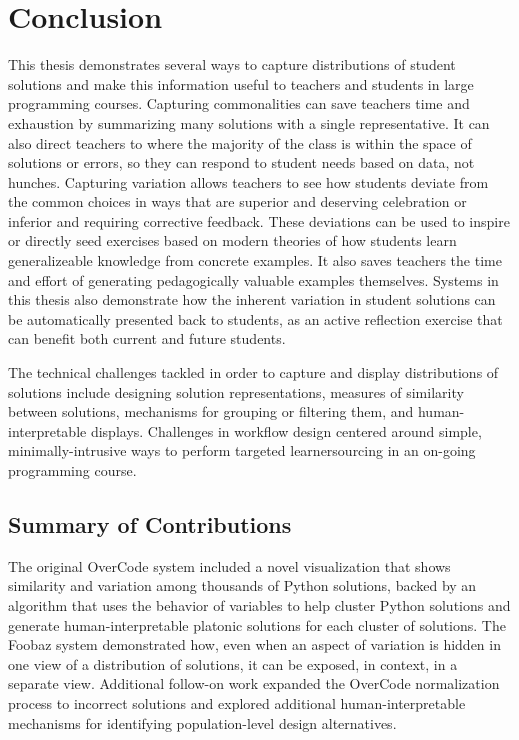 \chapter{Conclusion}\label{chapter:conclusion}

This thesis demonstrates several ways to capture distributions of student solutions and make this information useful to teachers and students in large programming courses. Capturing commonalities can save teachers time and exhaustion by summarizing many solutions with a single representative. It can also direct teachers to where the majority of the class is within the space of solutions or errors, so they can respond to student needs based on data, not hunches. Capturing variation allows teachers to see how students deviate from the common choices in ways that are superior and deserving celebration or inferior and requiring corrective feedback. These deviations can be used to inspire or directly seed exercises based on modern theories of how students learn generalizeable knowledge from concrete examples. It also saves teachers the time and effort of generating pedagogically valuable examples themselves. Systems in this thesis also demonstrate how the inherent variation in student solutions can be automatically presented back to students, as an active reflection exercise that can benefit both current and future students. 

The technical challenges tackled in order to capture and display distributions of solutions include designing solution representations, measures of similarity between solutions, mechanisms for grouping or filtering them, and human-interpretable displays. Challenges in workflow design centered around simple, minimally-intrusive ways to perform targeted learnersourcing in an on-going programming course.

\section{Summary of Contributions}

The original OverCode system included a novel visualization that shows similarity and variation among thousands of Python solutions, backed by an algorithm that uses the behavior of variables to help cluster Python solutions and generate human-interpretable platonic solutions for each cluster of solutions. The Foobaz system demonstrated how, even when an aspect of variation is hidden in one view of a distribution of solutions, it can be exposed, in context, in a separate view. Additional follow-on work expanded the OverCode normalization process to incorrect solutions and explored additional human-interpretable mechanisms for identifying population-level design alternatives.

